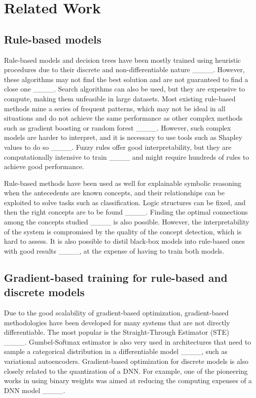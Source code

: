 \section{Related Work}
\subsection{Rule-based models}
Rule-based models and decision trees have been mostly trained using heuristic procedures due to their discrete and non-differentiable nature ____. However, these algorithms may not find the best solution and are not guaranteed to find a close one ____. Search algorithms can also be used, but they are expensive to compute, making them unfeasible in large datasets. Most existing rule-based methods mine a series of frequent patterns, which may not be ideal in all situations and do not achieve the same performance as other complex methods such as gradient boosting or random forest ____. However, such complex models are harder to interpret, and it is necessary to use tools such as Shapley values to do so ____. Fuzzy rules offer good interpretability, but they are computationally intensive to train ____ and might require hundreds of rules to achieve good performance. 

Rule-based methods have been used as well for explainable symbolic reasoning when the antecedents are known concepts, and their relationships can be exploited to solve tasks such as classification. Logic structures can be fixed, and then the right concepts are to be found ____. Finding the optimal connections among the concepts studied ____ is also possible. However, the interpretability of the system is compromised by the quality of the concept detection, which is hard to assess. It is also possible to distil black-box models into rule-based ones with good results ____, at the expense of having to train both models.

\subsection{Gradient-based training for rule-based and discrete models} 
Due to the good scalability of gradient-based optimization, gradient-based methodologies have been developed for many systems that are not directly differentiable. The most popular is the Straight-Through Estimator (STE) ____. Gumbel-Softmax estimator is also very used in architectures that need to sample a categorical distribution in a differentiable model ____, such as variational autoencoders. Gradient-based optimization for discrete models is also closely related to the quantization of a DNN. For example, one of the pioneering works in using binary weights was aimed at reducing the computing expenses of a DNN model ____.

